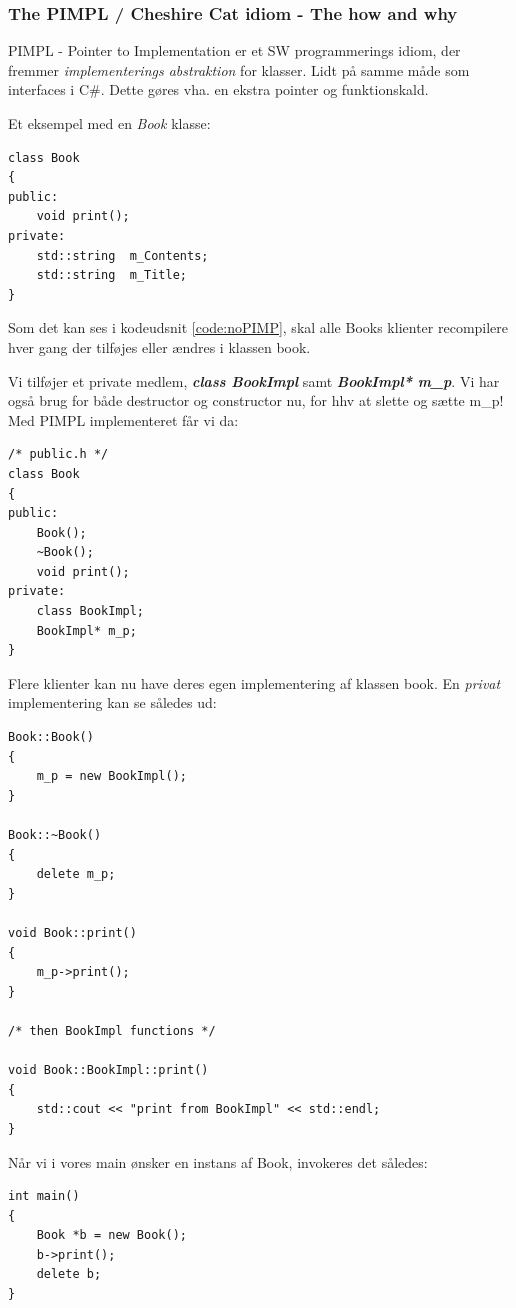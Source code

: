 \subsubsection{The PIMPL / Cheshire Cat idiom - The how and why}

PIMPL - Pointer to Implementation er et SW programmerings idiom, der fremmer \textit{implementerings abstraktion} for klasser. Lidt på samme måde som interfaces i C\#. Dette gøres vha. en ekstra pointer og funktionskald.

Et eksempel med en \textit{Book} klasse:

\begin{lstlisting}[caption=Klassen Book uden PIMPL, label=code:noPIMP]
class Book
{
public:
	void print();
private:
	std::string  m_Contents;
	std::string  m_Title;
}
\end{lstlisting}

Som det kan ses i kodeudsnit \ref{code:noPIMP}, skal alle Books klienter recompilere hver gang der tilføjes eller ændres i klassen book.

Vi tilføjer et private medlem, \textbf{\textit{class BookImpl}} samt \textbf{\textit{BookImpl* m\_p}}. Vi har også brug for både destructor og constructor nu, for hhv at slette og sætte m\_p! Med PIMPL implementeret får vi da:

\begin{lstlisting}[caption=Klassen Book med PIMPL implementeret, label=code:PIMP]
/* public.h */
class Book
{
public:
	Book();
	~Book();
	void print();
private:
	class BookImpl;
	BookImpl* m_p;
}
\end{lstlisting}

Flere klienter kan nu have deres egen implementering af klassen book. En \textit{privat} implementering kan se således ud:

\begin{lstlisting}[caption=Privat implementering af klassen Book, label=code:PIMP]
Book::Book()
{
	m_p = new BookImpl();
}

Book::~Book()
{
	delete m_p;
}

void Book::print()
{
	m_p->print();
}

/* then BookImpl functions */

void Book::BookImpl::print()
{
	std::cout << "print from BookImpl" << std::endl;
}
\end{lstlisting}

Når vi i vores main ønsker en instans af Book, invokeres det således:
\begin{lstlisting}[caption=Brug af Book klassen i main(), label=code:mainPimpl]
int main()
{
	Book *b = new Book();
	b->print();
	delete b;
}
\end{lstlisting}


